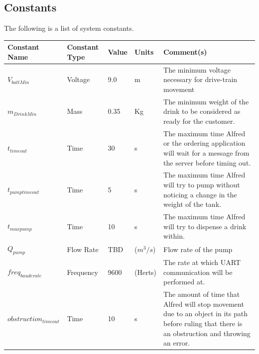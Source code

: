 \documentclass [10pt]{article}
\begin{document}

\subsection{Constants}

The following is a list of system constants. \\

\begin{longtable}{| p{} | p{} | p{} | p{} | p{} |}\hline 
	\rowcolor{tableCell}\textbf{Constant Name} & \textbf{Constant Type} & \textbf{Value} & \textbf{Units} & \textbf{Comment(s)} \\ \hline
 	$ V_{battMin} $ & Voltage & 9.0& m &  The minimum voltage necessary for drive-train movement \\ \hline
	\rowcolor{tableCell}$ m_{DrinkMin} $ & Mass & 0.35 & Kg &  The minimum weight of the drink to be considered as ready for the customer.  \\ \hline
	$ t_{timeout} $ & Time & 30 & s & The maximum time Alfred or the ordering application will wait for a message from the server before timing out.  \\ \hline
	\rowcolor{tableCell}$ t_{pumptimeout} $ & Time & 5 & s & The maximum time Alfred will try to pump without noticing a change in the weight of the tank.  \\ \hline
	$ t_{maxpump} $ & Time & 10 & s & The maximum time Alfred will try to dispense a drink within. \\ \hline
	\rowcolor{tableCell}$Q_{pump}$ & Flow Rate & TBD & ($m^3/s$) &  Flow rate of the pump\\ \hline
	$ freq_{bauderate} $ & Frequency & 9600 & (Herts) &  The  rate at which UART communication will be performed at.\\ \hline
	\rowcolor{tableCell}$ obstruction_{timeout} $ & Time & 10 & s & The amount of time that Alfred will stop movement due to an object in its path before ruling that there is an obstruction and throwing an error. \\ \hline
\end{longtable}


\end{document}
